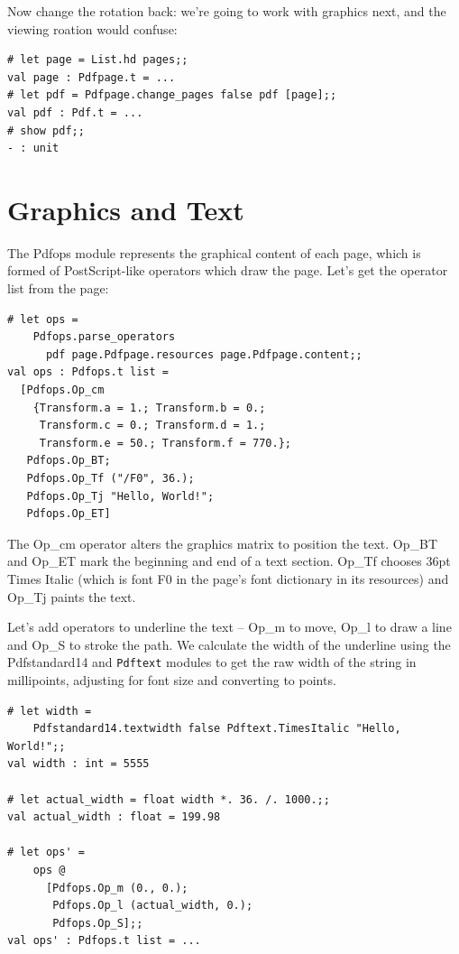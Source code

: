 \documentclass[a4paper]{memoir}
\begin{document}
\noindent Now change the rotation back: we're going to work with graphics next, and the viewing roation would confuse:
\begin{framed}
\small\begin{verbatim}
# let page = List.hd pages;;
val page : Pdfpage.t = ...
# let pdf = Pdfpage.change_pages false pdf [page];;
val pdf : Pdf.t = ...
# show pdf;;
- : unit
\end{verbatim}
\end{framed}
\section*{Graphics and Text}
The \textsf{Pdfops} module represents the graphical content of each page, which is formed of PostScript-like operators which draw the page. Let's get the operator list from the page:
\begin{framed}
\small\begin{verbatim}
# let ops =
    Pdfops.parse_operators
      pdf page.Pdfpage.resources page.Pdfpage.content;;
val ops : Pdfops.t list =
  [Pdfops.Op_cm
    {Transform.a = 1.; Transform.b = 0.;
     Transform.c = 0.; Transform.d = 1.;
     Transform.e = 50.; Transform.f = 770.};
   Pdfops.Op_BT;
   Pdfops.Op_Tf ("/F0", 36.);
   Pdfops.Op_Tj "Hello, World!";
   Pdfops.Op_ET]
\end{verbatim}
\end{framed}
\noindent The \textsf{Op\_cm} operator alters the graphics matrix to position the text. \textsf{Op\_BT} and \textsf{Op\_ET} mark the beginning and end of a text section. \textsf{Op\_Tf} chooses 36pt Times Italic (which is font \textsf{F0} in the page's font dictionary in its resources) and \textsf{Op\_Tj} paints the text.

Let's add operators to underline the text -- \textsf{Op\_m} to move, \textsf{Op\_l} to draw a line and \textsf{Op\_S} to stroke the path. We calculate the width of the underline using the \textsf{Pdfstandard14} and \texttt{Pdftext} modules to get the raw width of the string in millipoints, adjusting for font size and converting to points.

\begin{framed}
\small\begin{verbatim}
# let width =
    Pdfstandard14.textwidth false Pdftext.TimesItalic "Hello, World!";;
val width : int = 5555

# let actual_width = float width *. 36. /. 1000.;;
val actual_width : float = 199.98

# let ops' =
    ops @
      [Pdfops.Op_m (0., 0.);
       Pdfops.Op_l (actual_width, 0.);
       Pdfops.Op_S];;
val ops' : Pdfops.t list = ...
\end{verbatim}
\end{framed}
\end{document}
